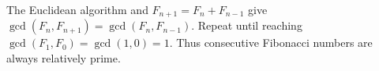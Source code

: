 The Euclidean algorithm and $F_{n+1}=F_n+F_{n-1}$ give $\gcd(F_n,F_{n+1})=\gcd(F_n,F_{n-1})$. Repeat until reaching $\gcd(F_1,F_0)=\gcd(1,0)=1$. Thus consecutive Fibonacci numbers are always relatively prime.
